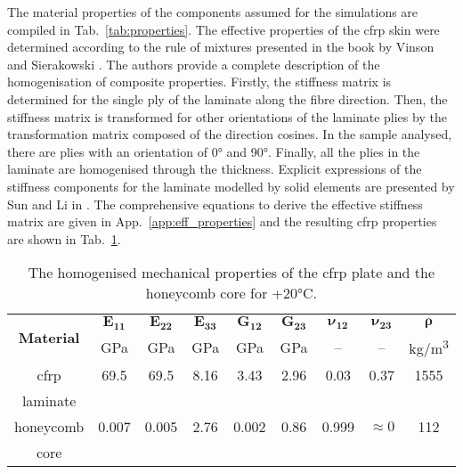 The material properties of the components assumed for the simulations are compiled in Tab.~\ref{tab:properties}.
The effective properties of the \ac{cfrp} skin were determined according to the rule of mixtures presented in the book by Vinson and Sierakowski \cite{vinson1993behavior}.
The authors provide a complete description of the homogenisation of composite properties.
Firstly, the stiffness matrix is determined for the single ply of the laminate along the fibre direction.
Then, the stiffness matrix is transformed for other orientations of the laminate plies by the transformation matrix composed of the direction cosines.
In the sample analysed, there are plies with an orientation of \ang{0} and \ang{90}.
Finally, all the plies in the laminate are homogenised through the thickness.
Explicit expressions of the stiffness components for the laminate modelled by solid elements are presented by Sun and Li in \cite{sun1988three}.
The comprehensive equations to derive the effective stiffness matrix are given in App.~\ref{app:eff_properties} and the resulting \ac{cfrp} properties are shown in Tab.~\ref{tab:properties_eff}.
\begin{table}[H]
	\centering
	\small
	\tabcolsep=0.25cm
	\caption{\label{tab:properties_eff} The homogenised mechanical properties of the \ac{cfrp} plate and the honeycomb core for +20\unit{\degreeCelsius}.}
	\begin{tabular}{ccccccccc}
		\toprule
		\multirow{2}{*}{\textbf{Material}} & \(\boldsymbol{E_{11}}\) & \(\boldsymbol{E_{22}}\) & \(\boldsymbol{E_{33}}\) & \(\boldsymbol{G_{12}}\) & \(\boldsymbol{G_{23}}\) & \(\boldsymbol{\nu_{12}}\)	& \(\boldsymbol{\nu_{23}}\) & \(\boldsymbol{\rho}\) \\
		& \unit{\giga\pascal} & \unit{\giga\pascal} & \unit{\giga\pascal} & \unit{\giga\pascal} & \unit{\giga\pascal} & -- & -- & \unit[per-mode = symbol]
		{\kilogram\per\cubic\metre}\\
		\midrule
		\ac{cfrp} & 69.5 & 69.5 & 8.16 & 3.43 & 2.96 & 0.03 & 0.37 & 1555\\
		laminate & & & & & & & &\\
		\midrule
		honeycomb & 0.007 & 0.005 & 2.76 & 0.002 & 0.86 & 0.999 & \(\approx0\) & 112\\
		core & & & & & & & &\\
		\bottomrule
	\end{tabular}
\end{table}
%